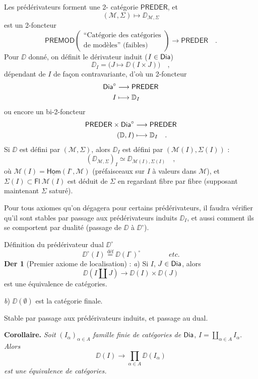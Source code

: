Les prédérivateurs forment une 2- catégorie $\mathsf{PREDER}$, et
\[ (\mathcal{M},\Sigma) \longmapsto \DD_{\mathcal{M},\Sigma} \]
est un 2-foncteur
\[ \mathsf{PREMOD}
\begin{pmatrix}
\text{“Catégorie des catégories} \\
\text{de modèles” (faibles)}
\end{pmatrix}
\longrightarrow \mathsf{PREDER} \quad . \]
Pour $\DD$ donné, on définit le dérivateur induit ($I \in \mathsf{Dia}$)
\[ \DD_I = \big(J \longmapsto \DD(I \times J)\big) \quad , \]
dépendant de $I$ de façon contravariante, d'où un 2-foncteur
\[ \begin{aligned}
\mathsf{Dia}^\circ &\longrightarrow \mathsf{PREDER} \\
I &\longmapsto \mathbb{D}_I
\end{aligned} \]
ou encore un bi-2-foncteur
\[ \begin{aligned}
\mathsf{PREDER} \times \mathsf{Dia}^\circ &\longrightarrow \mathsf{PREDER} \\
(\mathbb{D}, I) &\longmapsto \mathbb{D}_I \quad .
\end{aligned} \]
Si $\DD$ est défini par $(\mathcal{M},\Sigma)$, alors $\DD_I$ est défini par $(\mathcal{M}(I),\Sigma(I))$ :
\[ (\DD_{\mathcal{M},\Sigma})_I \simeq \DD_{\mathcal{M}(I),\Sigma(I)} \quad , \]
où $\mathcal{M}(I) = \underline{\mathsf{Hom}}(I^\circ,\mathcal{M})$ (préfaisceaux sur $I$ à valeurs dans $\mathcal{M}$), et $\Sigma(I) \subset \mathsf{Fl}\ \mathcal{M}(I)$ est déduit de $\Sigma$ en regardant fibre par fibre (supposant maintenant $\Sigma$ saturé). %

Pour tous axiomes qu'on dégagera pour certains prédérivateurs, il faudra vérifier qu'il sont stables par passage aux prédérivateurs induits $\DD_I$, et aussi comment ils se comportent par dualité (passage de $\DD$ à $\DD^\circ$). %

Définition du prédérivateur dual $\DD^\circ$
\[ \DD^\circ(I) \overset{\text{déf}}{=} \DD(I^\circ)^\circ \qquad\qquad \textit{etc.} \]
\textbf{Der 1} (Premier axiome de localisation) : \textit{a}) Si $I$, $J \in \mathsf{Dia}$, alors
\[ \DD(I \amalg J) \longrightarrow \DD(I) \times \DD(J) \]
est une équivalence de catégories.

\textit{b}) $\DD(\emptyset)$ est la catégorie finale.

Stable par passage aux prédérivateurs induits, et passage au dual.

\textbf{Corollaire.} \textit{Soit} $(I_\alpha)_{\alpha \in A}$ \textit{famille finie de catégories de} $\mathsf{Dia}$, $I = \coprod\limits_{\alpha \in A} I_\alpha$. \textit{Alors}
\[ \DD(I) \longrightarrow \prod_{\alpha \in A} \DD(I_\alpha) \]
\textit{est une équivalence de catégories.}

